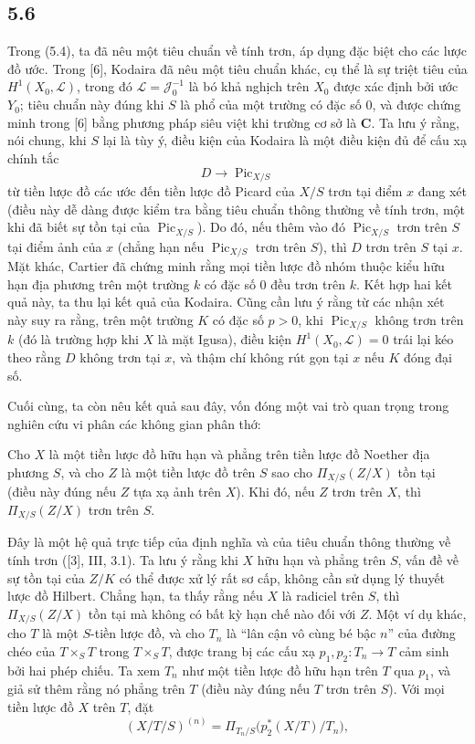 \subsection*{5.6}

Trong (5.4), ta đã nêu một tiêu chuẩn về tính trơn, áp dụng đặc biệt cho các
lược đồ ước. Trong [6], Kodaira đã nêu một tiêu chuẩn khác, cụ thể là sự triệt
tiêu của $H^1(X_0,\mathcal L)$, trong đó $\mathcal L=\mathcal J_0^{-1}$ là bó
khả nghịch trên $X_0$ được xác định bởi ước $Y_0$; tiêu chuẩn này đúng khi $S$
là phổ của một trường có đặc số 0, và được chứng minh trong [6] bằng phương
pháp siêu việt khi trường cơ sở là $\mathbf C$. Ta lưu ý rằng, nói chung, khi
$S$ lại là tùy ý, điều kiện của Kodaira là một điều kiện đủ để cấu xạ chính tắc
\[
D\longrightarrow\operatorname{Pic}_{X/S}
\]
từ tiền lược đồ các ước đến tiền lược đồ Picard của $X/S$ trơn tại điểm $x$
đang xét (điều này dễ dàng được kiểm tra bằng tiêu chuẩn thông thường về tính
trơn, một khi đã biết sự tồn tại của $\operatorname{Pic}_{X/S}$). Do đó, nếu
thêm vào đó $\operatorname{Pic}_{X/S}$ trơn trên $S$ tại điểm ảnh của $x$
(chẳng hạn nếu $\operatorname{Pic}_{X/S}$ trơn trên $S$), thì $D$ trơn trên
$S$ tại $x$. Mặt khác, Cartier đã chứng minh rằng mọi tiền lược đồ nhóm thuộc
kiểu hữu hạn địa phương trên một trường $k$ có đặc số 0 đều trơn trên $k$. Kết
hợp hai kết quả này, ta thu lại kết quả của Kodaira. Cũng cần lưu ý rằng từ các
nhận xét này suy ra rằng, trên một trường $K$ có đặc số $p>0$, khi
$\operatorname{Pic}_{X/S}$ không trơn trên $k$ (đó là trường hợp khi $X$ là
mặt Igusa), điều kiện $H^1(X_0,\mathcal L)=0$ trái lại kéo theo rằng $D$ không
trơn tại $x$, và thậm chí không rút gọn tại $x$ nếu $K$ đóng đại số.

Cuối cùng, ta còn nêu kết quả sau đây, vốn đóng một vai trò quan trọng trong
nghiên cứu vi phân các không gian phân thớ:

 Cho $X$ là một tiền lược đồ hữu hạn và phẳng trên tiền
lược đồ Noether địa phương $S$, và cho $Z$ là một tiền lược đồ trên $S$ sao
cho $\Pi_{X/S}(Z/X)$ tồn tại (điều này đúng nếu $Z$ tựa xạ ảnh trên $X$). Khi
đó, nếu $Z$ trơn trên $X$, thì $\Pi_{X/S}(Z/X)$ trơn trên $S$.

Đây là một hệ quả trực tiếp của định nghĩa và của tiêu chuẩn thông thường về
tính trơn ([3], III, 3.1). Ta lưu ý rằng khi $X$ hữu hạn và phẳng trên $S$,
vấn đề về sự tồn tại của
$Z/K$ có thể
được xử lý rất sơ cấp, không cần
sử dụng lý thuyết lược đồ Hilbert. Chẳng hạn, ta thấy rằng nếu $X$ là
radiciel trên $S$, thì $\Pi_{X/S}(Z/X)$ tồn tại mà không có bất kỳ hạn chế nào
đối với $Z$. Một ví dụ khác, cho $T$ là một $S$-tiền lược đồ, và cho $T_n$ là
``lân cận vô cùng bé bậc $n$'' của đường chéo của $T\times_ST$ trong
$T\times_ST$, được trang bị các cấu xạ $p_1,p_2:T_n\longrightarrow T$ cảm
sinh bởi hai phép chiếu. Ta xem $T_n$ như một tiền lược đồ hữu hạn trên $T$
qua $p_1$, và giả sử thêm rằng nó phẳng trên $T$ (điều này đúng nếu $T$ trơn
trên $S$). Với mọi tiền lược đồ $X$ trên $T$, đặt
\[
(X/T/S)^{(n)}=
\Pi_{T_n/S}\bigl(p_2^*(X/T)/T_n\bigr),
\]

